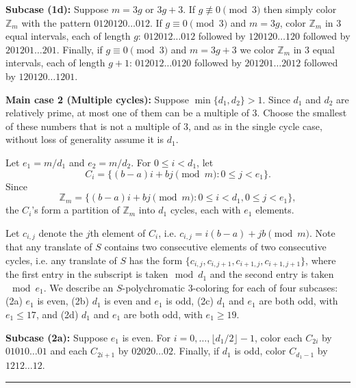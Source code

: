 \documentclass[12pt]{article}
\newcommand{\junk}[1]{}
\newenvironment{proofof}[1]{{\bf Proof of #1:  }}{\hfill\rule{2mm}{2mm}}
\newcommand{\Z}{\ensuremath{\mathbb Z}}
\begin{document}
\begin{proofof}{Theorem~\ref{ps34}}
\textbf{Subcase (1d):} Suppose $m=3g$ or $3g+3$. If $g\not\equiv 0 \pmod{3}$ then simply color $\Z_m$ with the pattern $0120120\ldots012$. If $g\equiv 0\pmod{3}$ and $m=3g$, color $\Z_m$ in 3 equal intervals, each of length $g$: $012012\ldots012$ followed by $120120\ldots120$ followed by $201201\ldots201$. Finally, if $g\equiv0 \pmod{3}$ and $m=3g+3$ we color $\Z_m$ in 3 equal intervals, each of length $g+1$: $012012\ldots0120$ followed by $201201\ldots2012$ followed by $120120\ldots1201$.

\textbf{Main case 2 (Multiple cycles):} Suppose $\min\{d_1,d_2\}>1$. Since $d_1$ and $d_2$ are relatively prime, at most one of them can be a multiple of 3.  Choose the smallest of these numbers that is not a multiple of 3, and as in the single cycle case, without loss of generality assume it is $d_1$.

Let $e_1=m/d_1$ and $e_2=m/d_2$. For $0 \le i <d_1$, let 
\[C_i = \{(b-a)i +bj\pmod{m}: 0 \le j < e_1\}.\] 
Since 
\[\Z_m=\{(b-a)i +bj \pmod{m} : 0\leq i < d_1, 0\leq j< e_1\},\] 
the $C_i$'s form a partition of $\Z_m$ into $d_1$ cycles, each with $e_1$ elements.

\junk{%
\begin{align*}
C_0&=\{0,b,2b,\ldots,(e_1-1)b\},\\
C_1&=\{(b-a),(b-a)+b,\ldots,(b-a)+(e_1-1)b\},\\
&\vdots\\
C_{d_1-1}&=\{(d_1-1)(b-a),\ldots,(d_1-1)(b-a)+(e_1-1)b\}.\\
\end{align*}
}%

Let $c_{i,j}$ denote the $j$th element of $C_i$, i.e. $c_{i,j}=i(b-a)+jb \pmod{m}$. Note that any translate of $S$ contains two consecutive elements of two consecutive cycles, i.e. any translate of $S$ has the form $\{c_{i,j}, c_{i,j+1}, c_{i+1,j}, c_{i+1,j+1}\}$, where the first entry in the subscript is taken$\mod{d_1}$ and the second entry is taken$\mod{e_1}$. We describe an $S$-polychromatic 3-coloring for each of four subcases: (2a) $e_1$ is even, (2b) $d_1$ is even and $e_1$ is odd, (2c) $d_1$ and $e_1$ are both odd, with $e_1\leq 17$, and (2d) $d_1$ and $e_1$ are both odd, with $e_1\geq 19$.

\textbf{Subcase (2a):} Suppose $e_1$ is even. For $i=0,\ldots,\lfloor d_1/2\rfloor -1$, color each $C_{2i}$ by  $01010\ldots 01$ and each $C_{2i+1}$ by $02020\ldots 02$. Finally, if $d_1$ is odd, color $C_{d_1-1}$ by $1212\ldots 12$.


\end{proofof}
\end{document}
